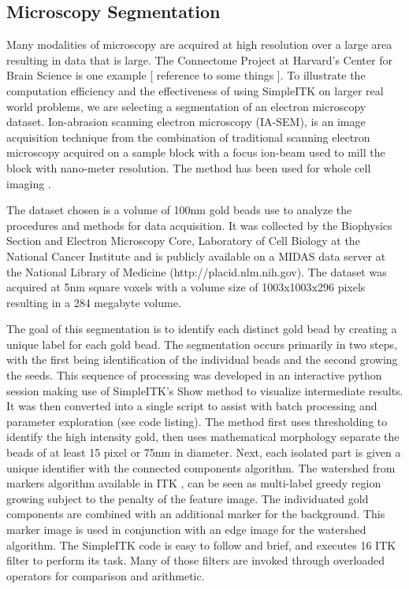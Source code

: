 \documentclass{frontiersMED} %
\begin{document}
\subsection{Microscopy Segmentation}
Many modalities of microscopy are acquired at high resolution over a
large area resulting in data that is large. The Connectome Project at
Harvard’s Center for Brain Science is one example [ reference to some
  things ]. To illustrate the computation efficiency and the
effectiveness of using SimpleITK on larger real world problems, we are
selecting a segmentation of an electron microscopy
dataset. Ion-abrasion scanning electron microscopy (IA-SEM), is an
image acquisition technique from the combination of traditional
scanning electron microscopy acquired on a sample block with a focus
ion-beam used to mill the block with nano-meter resolution. The method
has been used for whole cell imaging \cite{Murphy2011}. 

The dataset chosen is a volume of 100nm gold beads  use to analyze the
procedures and methods for data acquisition. It was collected by the
Biophysics Section and Electron Microscopy Core, Laboratory of Cell
Biology at the National Cancer Institute and is publicly available on
a MIDAS data server at the National Library of Medicine
(http://placid.nlm.nih.gov). The dataset was acquired at 5nm square
voxels with a volume size of 1003x1003x296 pixels resulting in a 284
megabyte volume. 
	
The goal of this segmentation is to identify each distinct gold bead
by creating a unique label for each gold bead. The segmentation occurs
primarily in two steps, with the first being  identification of the
individual beads and the second growing the seeds. This sequence of
processing was developed in an interactive python session making use
of SimpleITK’s Show method to visualize intermediate results. It was
then converted into a single script to assist with batch processing
and parameter exploration (see code listing). The method first uses
thresholding to identify the high intensity gold, then uses
mathematical morphology separate the beads of at least 15 pixel or
75nm in diameter. Next, each isolated part is given a unique
identifier with the connected components algorithm. The watershed from
markers algorithm available in ITK \cite{Beare2006}, can be seen as
multi-label greedy region growing subject to the penalty of the
feature image. The individuated gold components are combined with an
additional marker for the background. This marker image is used in
conjunction with an edge image for the watershed algorithm. The
SimpleITK code is easy to follow and brief, and executes 16 ITK filter
to perform its task. Many of those filters are invoked through
overloaded operators for comparison and arithmetic. 
\end{document}
